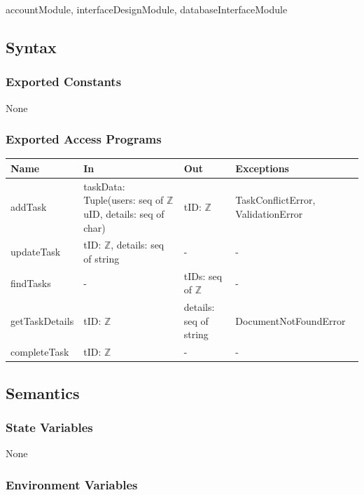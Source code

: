 \documentclass[12pt, titlepage]{article}
\begin{document}
accountModule, interfaceDesignModule, databaseInterfaceModule

\subsection{Syntax}

\subsubsection{Exported Constants}

None

\subsubsection{Exported Access Programs}

\begin{center}
\begin{tabular}{p{3cm} p{5cm} p{2cm} p{4.5cm}}
\hline
\textbf{Name} & \textbf{In} & \textbf{Out} & \textbf{Exceptions} \\
\hline
addTask & taskData: Tuple(users: seq of $\mathbb{Z}$ uID, details: seq of char)  & tID: $\mathbb{Z}$  & TaskConflictError, ValidationError \\
\hline
updateTask & tID: $\mathbb{Z}$, details: seq of string  & -  & - \\
\hline
findTasks & - & tIDs: seq of $\mathbb{Z}$  & - \\
\hline
getTaskDetails & tID: $\mathbb{Z}$ & details: seq of string & DocumentNotFoundError \\
\hline
completeTask & tID: $\mathbb{Z}$ & -  &  - \\
\hline
\end{tabular}
\end{center}

\subsection{Semantics}

\subsubsection{State Variables}

None



\subsubsection{Environment Variables}
\end{document}
